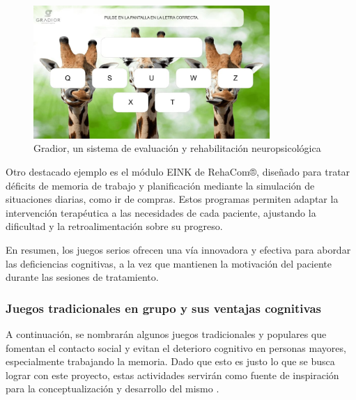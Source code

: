\begin{figure}[ht]
    \centering
    \includegraphics[width=0.8\textwidth]{imgs/gradior.jpg}
    \caption{Gradior, un sistema de evaluación y rehabilitación neuropsicológica}
    \label{fig:gradior}
\end{figure}

Otro destacado ejemplo es el módulo EINK de RehaCom®, diseñado para tratar déficits de memoria de trabajo y planificación mediante la simulación de situaciones diarias, como ir de compras. Estos programas permiten adaptar la intervención terapéutica a las necesidades de cada paciente, ajustando la dificultad y la retroalimentación sobre su progreso.

En resumen, los juegos serios ofrecen una vía innovadora y efectiva para abordar las deficiencias cognitivas, a la vez que mantienen la motivación del paciente durante las sesiones de tratamiento.

\newpage
\subsubsection{Juegos tradicionales en grupo y sus ventajas cognitivas}

A continuación, se nombrarán algunos juegos tradicionales y populares que fomentan el contacto social y evitan el deterioro cognitivo en personas mayores, especialmente trabajando la memoria. Dado que esto es justo lo que se busca lograr con este proyecto, estas actividades servirán como fuente de inspiración para la conceptualización y desarrollo del mismo \parencite{juegosMem2}.

